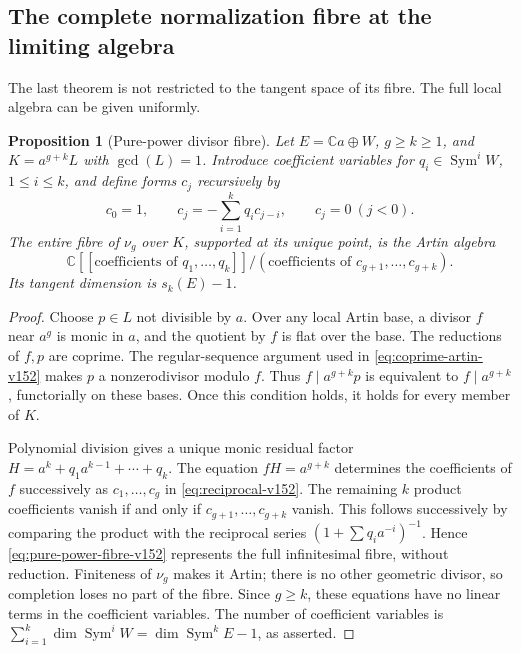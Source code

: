 \documentclass[11pt,reqno]{amsart}
\numberwithin{equation}{section}
\newtheorem{proposition}[theorem]{Proposition}
\theoremstyle{definition}\newtheorem{definition}[theorem]{Definition}
\theoremstyle{remark}\newtheorem{remark}[theorem]{Remark}
\newcommand{\C}{\mathbb C}\newcommand{\Q}{\mathbb Q}
\DeclareMathOperator{\Sym}{Sym}\DeclareMathOperator{\Gr}{Gr}
\begin{document}
\subsection{The complete normalization fibre at the limiting algebra}
The last theorem is not restricted to the tangent space of its fibre.
The full local algebra can be given uniformly.

\begin{proposition}[Pure-power divisor fibre]
\label{prop:pure-power-fibre-v152}
Let $E=\C a\oplus W$, $g\geq k\geq1$, and
$K=a^{g+k}L$ with $\gcd(L)=1$.  Introduce coefficient variables for
$q_i\in\Sym^i W$, $1\leq i\leq k$, and define forms $c_j$ recursively by
\begin{equation}\label{eq:reciprocal-v152}
 c_0=1,\qquad c_j=-\sum_{i=1}^k q_i c_{j-i},\qquad c_j=0\ (j<0).
\end{equation}
The entire fibre of $\nu_g$ over $K$, supported at its unique point,
is the Artin algebra
\begin{equation}\label{eq:pure-power-fibre-v152}
 \C[[\text{coefficients of }q_1,\ldots,q_k]]\big/
     (\text{coefficients of }c_{g+1},\ldots,c_{g+k}).
\end{equation}
Its tangent dimension is $s_k(E)-1$.
\end{proposition}
\begin{proof}
Choose $p\in L$ not divisible by $a$.  Over any local Artin base,
a divisor $f$ near $a^g$ is monic in $a$, and the quotient by $f$
is flat over the base.  The reductions of $f,p$ are coprime.
The regular-sequence argument used in
\eqref{eq:coprime-artin-v152} makes $p$ a nonzerodivisor modulo $f$.
Thus $f\mid a^{g+k}p$ is equivalent to $f\mid a^{g+k}$, functorially
on these bases.  Once this condition holds, it holds for every
member of $K$.

Polynomial division gives a unique monic residual factor
$H=a^k+q_1a^{k-1}+\cdots+q_k$.  The equation $fH=a^{g+k}$ determines
the coefficients of $f$ successively as $c_1,\ldots,c_g$ in
\eqref{eq:reciprocal-v152}.  The remaining $k$ product coefficients
vanish if and only if $c_{g+1},\ldots,c_{g+k}$ vanish.  This follows
successively by comparing the product with the reciprocal series
$(1+\sum q_i a^{-i})^{-1}$.  Hence
\eqref{eq:pure-power-fibre-v152} represents the full infinitesimal
fibre, without reduction.  Finiteness of $\nu_g$ makes it Artin;
there is no other geometric divisor, so completion loses no part
of the fibre.  Since $g\geq k$, these equations have no linear
terms in the coefficient variables.  The number of coefficient variables is
$\sum_{i=1}^k\dim\Sym^iW=\dim\Sym^kE-1$, as asserted.
\end{proof}
\end{document}
